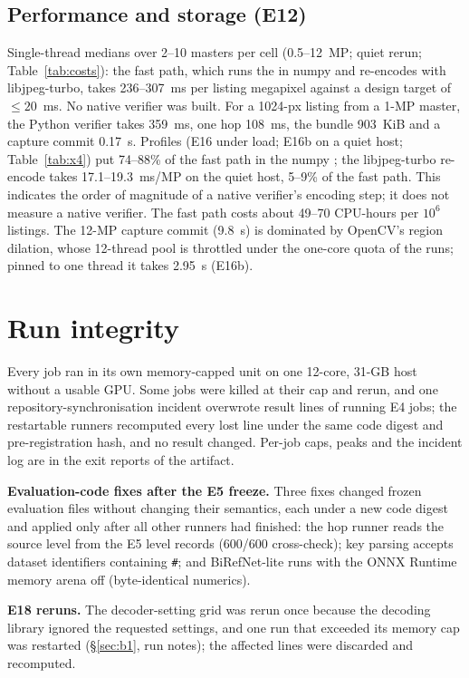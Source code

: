\documentclass[10pt]{article}
\begin{document}
\subsection{Performance and storage (E12)}
Single-thread medians over 2--10 masters per cell (0.5--12~MP; quiet rerun; Table~\ref{tab:costs}): the
fast path, which runs the \Compile{} in numpy and re-encodes with libjpeg-turbo, takes 236--307~ms per listing megapixel
against a design target of $\le20$~ms. No native verifier was built. For a 1024-px listing from a 1-MP master, the Python
\Ezero{} verifier takes 359~ms, one hop 108~ms, the bundle 903~KiB and a capture commit 0.17~s. Profiles (E16 under load; E16b on a
quiet host; Table~\ref{tab:x4}) put 74--88\% of the fast path in the numpy \Compile{}; the libjpeg-turbo
re-encode takes 17.1--19.3~ms/MP on the quiet host, 5--9\% of the fast path. This indicates the order of magnitude of a native verifier's encoding step; it does not measure a native verifier. The fast path costs about 49--70 CPU-hours per
$10^6$ listings. The 12-MP capture commit (9.8~s) is dominated by OpenCV's region dilation, whose 12-thread pool is
throttled under the one-core quota of the runs; pinned to one thread it takes 2.95~s (E16b).

\section{Run integrity}
\label{sec:runintegrity}
Every job ran in its own memory-capped unit on one 12-core, 31-GB host without a usable GPU. Some jobs were killed at
their cap and rerun, and one repository-synchronisation incident overwrote result lines of running E4 jobs; the
restartable runners recomputed every lost line under the same code digest and pre-registration hash, and no result
changed. Per-job caps, peaks and the incident log are in the exit reports of the artifact.

\textbf{Evaluation-code fixes after the E5 freeze.} Three fixes changed frozen evaluation files without changing their
semantics, each under a new code digest and applied only after all other runners had finished: the  hop runner
reads the source level from the E5 level records (600/600 cross-check); key parsing accepts dataset identifiers
containing \texttt{\#}; and BiRefNet-lite runs with the ONNX Runtime memory arena off (byte-identical numerics).

\textbf{E18 reruns.} The decoder-setting grid was rerun once because the decoding library ignored the requested
settings, and one run that exceeded its memory cap was restarted (\S\ref{sec:b1}, run notes); the affected lines were
discarded and recomputed.
\end{document}
